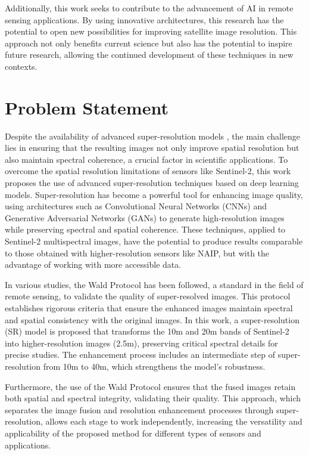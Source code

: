Additionally, this work seeks to contribute to the advancement of AI in remote sensing applications. By using innovative architectures, this research has the potential to open new possibilities for improving satellite image resolution. This approach not only benefits current science but also has the potential to inspire future research, allowing the continued development of these techniques in new contexts.

\section{Problem Statement}

Despite the availability of advanced super-resolution models \autocite{salgueiro2020super, navarro_sánchez_2020}, the main challenge lies in ensuring that the resulting images not only improve spatial resolution but also maintain spectral coherence, a crucial factor in scientific applications. To overcome the spatial resolution limitations of sensors like Sentinel-2, this work proposes the use of advanced super-resolution techniques based on deep learning models. Super-resolution has become a powerful tool for enhancing image quality, using architectures such as Convolutional Neural Networks (CNNs) and Generative Adversarial Networks (GANs) to generate high-resolution images while preserving spectral and spatial coherence. These techniques, applied to Sentinel-2 multispectral images, have the potential to produce results comparable to those obtained with higher-resolution sensors like NAIP, but with the advantage of working with more accessible data.

In various studies, the Wald Protocol has been followed, a standard in the field of remote sensing, to validate the quality of super-resolved images. This protocol establishes rigorous criteria that ensure the enhanced images maintain spectral and spatial consistency with the original images. In this work, a super-resolution (SR) model is proposed that transforms the 10m and 20m bands of Sentinel-2 into higher-resolution images (2.5m), preserving critical spectral details for precise studies. The enhancement process includes an intermediate step of super-resolution from 10m to 40m, which strengthens the model's robustness.

Furthermore, the use of the Wald Protocol ensures that the fused images retain both spatial and spectral integrity, validating their quality. This approach, which separates the image fusion and resolution enhancement processes through super-resolution, allows each stage to work independently, increasing the versatility and applicability of the proposed method for different types of sensors and applications.

